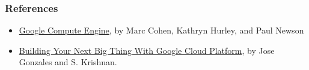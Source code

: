 \documentclass[9pt]{beamer}
\begin{document}
\begin{frame}[fragile]
  \frametitle{References}
  \begin{itemize}
  \item \href{http://www.amazon.com/Google-Compute-Engine-Marc-Cohen/dp/1449360882/ref=sr_1_1?ie=UTF8&qid=1452552286&sr=8-1&keywords=Google+Compute+Engine}{Google Compute Engine}, by Marc Cohen, Kathryn Hurley, and Paul Newson
  \item \href{http://www.amazon.com/Building-Thing-Google-Cloud-Platform/dp/1484210050/ref=pd_sim_14_2?ie=UTF8&dpID=51NfTEhpFlL&dpSrc=sims&preST=_AC_UL160_SR11\%2C160_&refRID=1XA05PG1Q6D5NW63685Y}{Building Your Next Big Thing With Google Cloud Platform}, by Jose Gonzales and S. Krishnan.
  \end{itemize}
\end{frame}
\end{document}
